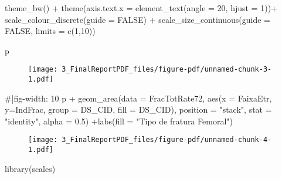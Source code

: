 \documentclass[
  letterpaper,
  DIV=11,
  numbers=noendperiod]{scrartcl}
\newenvironment{Shaded}{\begin{snugshade}}{\end{snugshade}}
\newcommand{\AttributeTok}[1]{\textcolor[rgb]{0.40,0.45,0.13}{#1}}
\newcommand{\CommentTok}[1]{\textcolor[rgb]{0.37,0.37,0.37}{#1}}
\newcommand{\ConstantTok}[1]{\textcolor[rgb]{0.56,0.35,0.01}{#1}}
\newcommand{\DecValTok}[1]{\textcolor[rgb]{0.68,0.00,0.00}{#1}}
\newcommand{\FloatTok}[1]{\textcolor[rgb]{0.68,0.00,0.00}{#1}}
\newcommand{\FunctionTok}[1]{\textcolor[rgb]{0.28,0.35,0.67}{#1}}
\newcommand{\NormalTok}[1]{\textcolor[rgb]{0.00,0.23,0.31}{#1}}
\newcommand{\SpecialCharTok}[1]{\textcolor[rgb]{0.37,0.37,0.37}{#1}}
\newcommand{\StringTok}[1]{\textcolor[rgb]{0.13,0.47,0.30}{#1}}
\begin{document}
\begin{Shaded}
\begin{Highlighting}[]
  \FunctionTok{theme\_bw}\NormalTok{() }\SpecialCharTok{+}
  \FunctionTok{theme}\NormalTok{(}\AttributeTok{axis.text.x =} \FunctionTok{element\_text}\NormalTok{(}\AttributeTok{angle =} \DecValTok{20}\NormalTok{, }\AttributeTok{hjust =} \DecValTok{1}\NormalTok{))}\SpecialCharTok{+}
  \FunctionTok{scale\_colour\_discrete}\NormalTok{(}\AttributeTok{guide =} \ConstantTok{FALSE}\NormalTok{) }\SpecialCharTok{+}
  \FunctionTok{scale\_size\_continuous}\NormalTok{(}\AttributeTok{guide =} \ConstantTok{FALSE}\NormalTok{, }\AttributeTok{limits =} \FunctionTok{c}\NormalTok{(}\DecValTok{1}\NormalTok{,}\DecValTok{10}\NormalTok{))}

\NormalTok{p}
\end{Highlighting}
\end{Shaded}

\begin{figure}[H]

{\centering \texttt{[image: 3\_FinalReportPDF\_files/figure-pdf/unnamed-chunk-3-1.pdf]}

}

\end{figure}

\begin{Shaded}
\begin{Highlighting}[]
\CommentTok{\#|fig{-}width: 10}
\NormalTok{p }\SpecialCharTok{+} \FunctionTok{geom\_area}\NormalTok{(}\AttributeTok{data =}\NormalTok{ FracTotRate72, }\FunctionTok{aes}\NormalTok{(}\AttributeTok{x =}\NormalTok{ FaixaEtr, }\AttributeTok{y=}\NormalTok{IndFrac, }\AttributeTok{group =}\NormalTok{ DS\_CID, }\AttributeTok{fill =}\NormalTok{ DS\_CID), }\AttributeTok{position =} \StringTok{"stack"}\NormalTok{, }\AttributeTok{stat =} \StringTok{"identity"}\NormalTok{, }\AttributeTok{alpha =} \FloatTok{0.5}\NormalTok{) }\SpecialCharTok{+}\FunctionTok{labs}\NormalTok{(}\AttributeTok{fill =} \StringTok{"Tipo de fratura Femoral"}\NormalTok{)}
\end{Highlighting}
\end{Shaded}

\begin{figure}[H]

{\centering \texttt{[image: 3\_FinalReportPDF\_files/figure-pdf/unnamed-chunk-4-1.pdf]}

}

\end{figure}

\begin{Shaded}
\begin{Highlighting}[]
\FunctionTok{library}\NormalTok{(scales)}
\end{Highlighting}
\end{Shaded}
\end{document}
